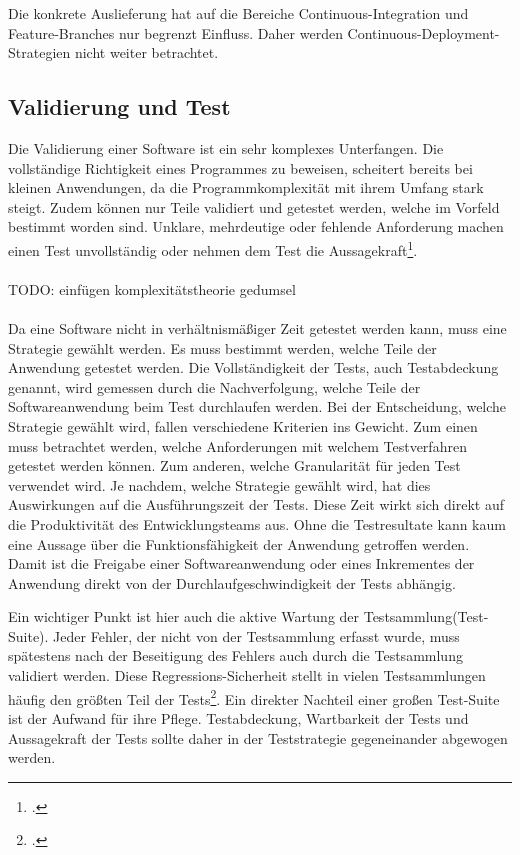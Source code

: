 Die konkrete Auslieferung hat auf die Bereiche Continuous-Integration und Feature-Branches nur begrenzt Einfluss. Daher 
werden Continuous-Deployment-Strategien nicht weiter betrachtet.

\subsection{Validierung und Test}

Die Validierung einer Software ist ein sehr komplexes Unterfangen. Die vollständige Richtigkeit eines Programmes 
zu beweisen, scheitert bereits bei kleinen Anwendungen, da die Programmkomplexität mit ihrem Umfang stark steigt. Zudem 
können nur Teile validiert und getestet werden, welche im Vorfeld bestimmt worden sind. Unklare, mehrdeutige oder 
fehlende Anforderung machen einen Test unvollständig oder nehmen dem Test die Aussagekraft\footcite[S. 243 Kapitel 4.6][]{software-quality2008}.
\\\\
TODO: einfügen komplexitätstheorie gedumsel
\\\\
Da eine Software nicht in verhältnismäßiger Zeit getestet werden kann, muss eine Strategie gewählt werden. Es muss 
bestimmt werden, welche Teile der Anwendung getestet werden. Die Vollständigkeit der Tests, auch Testabdeckung genannt, wird gemessen durch die Nachverfolgung, welche Teile der Softwareanwendung beim Test durchlaufen werden. Bei der Entscheidung, welche Strategie gewählt wird, fallen verschiedene Kriterien ins Gewicht. Zum einen muss betrachtet werden, welche Anforderungen mit welchem Testverfahren getestet werden können. Zum anderen, welche Granularität für jeden Test verwendet wird.
Je nachdem, welche Strategie gewählt wird, hat dies Auswirkungen auf die Ausführungszeit der Tests. Diese Zeit wirkt sich 
direkt auf die Produktivität des Entwicklungsteams aus. Ohne die Testresultate kann kaum eine Aussage über die 
Funktionsfähigkeit der Anwendung getroffen werden. Damit ist die Freigabe einer Softwareanwendung oder eines Inkrementes 
der Anwendung direkt von der Durchlaufgeschwindigkeit der Tests abhängig.

Ein wichtiger Punkt ist hier auch die aktive Wartung der Testsammlung(Test-Suite). Jeder Fehler, der nicht von der Testsammlung erfasst wurde, muss spätestens nach der Beseitigung des Fehlers auch durch die Testsammlung validiert werden. Diese Regressions-Sicherheit stellt in vielen Testsammlungen häufig den größten Teil der Tests\footcite[vgl.][]{software-quality2008}. Ein direkter Nachteil einer großen Test-Suite ist der Aufwand für ihre Pflege. Testabdeckung, Wartbarkeit der Tests und Aussagekraft der Tests sollte daher in der Teststrategie gegeneinander abgewogen werden.

